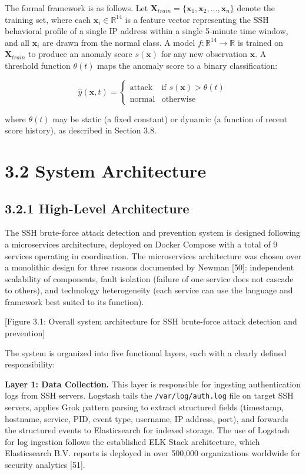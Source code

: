 \documentclass[
  a4paper]{report}
\begin{document}
The formal framework is as follows. Let
\(\mathbf{X}_{train} = \{\mathbf{x}_1, \mathbf{x}_2, \ldots, \mathbf{x}_n\}\)
denote the training set, where each \(\mathbf{x}_i \in \mathbb{R}^{14}\)
is a feature vector representing the SSH behavioral profile of a single
IP address within a single 5-minute time window, and all
\(\mathbf{x}_i\) are drawn from the normal class. A model
\(f: \mathbb{R}^{14} \rightarrow \mathbb{R}\) is trained on
\(\mathbf{X}_{train}\) to produce an anomaly score \(s(\mathbf{x})\) for
any new observation \(\mathbf{x}\). A threshold function \(\theta(t)\)
maps the anomaly score to a binary classification:

\[\hat{y}(\mathbf{x}, t) = \begin{cases} \text{attack} & \text{if } s(\mathbf{x}) > \theta(t) \\ \text{normal} & \text{otherwise} \end{cases}\]

where \(\theta(t)\) may be static (a fixed constant) or dynamic (a
function of recent score history), as described in Section 3.8.

\section{3.2 System Architecture}\label{system-architecture}

\subsection{3.2.1 High-Level
Architecture}\label{high-level-architecture}

The SSH brute-force attack detection and prevention system is designed
following a microservices architecture, deployed on Docker Compose with
a total of 9 services operating in coordination. The microservices
architecture was chosen over a monolithic design for three reasons
documented by Newman {[}50{]}: independent scalability of components,
fault isolation (failure of one service does not cascade to others), and
technology heterogeneity (each service can use the language and
framework best suited to its function).

{[}Figure 3.1: Overall system architecture for SSH brute-force attack
detection and prevention{]}

The system is organized into five functional layers, each with a clearly
defined responsibility:

\textbf{Layer 1: Data Collection.} This layer is responsible for
ingesting authentication logs from SSH servers. Logstash tails the
\texttt{/var/log/auth.log} file on target SSH servers, applies Grok
pattern parsing to extract structured fields (timestamp, hostname,
service, PID, event type, username, IP address, port), and forwards the
structured events to Elasticsearch for indexed storage. The use of
Logstash for log ingestion follows the established ELK Stack
architecture, which Elasticsearch B.V. reports is deployed in over
500,000 organizations worldwide for security analytics {[}51{]}.
\end{document}
